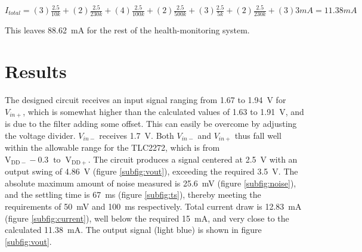 $I_{total} = (3)\frac{2.5}{10k} + (2)\frac{2.5}{230k} + (4)\frac{2.5}{100k} + (2)\frac{2.5}{500k} + (3)\frac{2.5}{5k} + (2)\frac{2.5}{230k} + (3)3mA = 11.38mA$

This leaves \SI{88.62}{mA} for the rest of the health-monitoring system.
 
\section{Results} \label{sec:temp_results}
The designed circuit receives an input signal ranging from 1.67 to \SI{1.94}{\volt} for $V_{in+}$, which is somewhat higher than the calculated values of 1.63 to \SI{1.91}{\volt}, and is due to the filter adding some offset. This can easily be overcome by adjusting the voltage divider. $V_{in-}$ receives \SI{1.7}{\volt}. Both $V_{in-}$ and $V_{in+}$ thus fall well within the allowable range for the TLC2272, which is from $\mathrm{V}_{\mathrm{DD}-}-0.3 \;\; \mathrm{to} \;\; \mathrm{V}_{\mathrm{DD}+}$\cite{tlc2272}.  The circuit produces a signal centered at \SI{2.5}{\volt} with an output swing of \SI{4.86}{\volt} (figure \ref{subfig:vout}), exceeding the required \SI{3.5}{\volt}. The absolute maximum amount of noise measured is \SI{25.6}{\milli\volt} (figure \ref{subfig:noise}), and the settling time is \SI{67}{ms} (figure \ref{subfig:ts}), thereby meeting the requirements of \SI{50}{\milli\volt} and \SI{100}{ms} respectively. Total current draw is \SI{12.83}{mA} (figure \ref{subfig:current}), well below the required \SI{15}{mA}, and very close to the calculated \SI{11.38}{mA}. The output signal (light blue) is shown in figure \ref{subfig:vout}.

